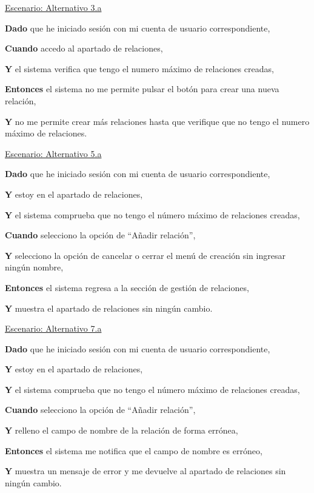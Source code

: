 \vspace{0.20cm}



\underline{Escenario: Alternativo 3.a}\par
\vspace{0.15cm}

\textbf{Dado} que he iniciado sesión con mi cuenta de usuario correspondiente,\par
\textbf{Cuando} accedo al apartado de relaciones,\par
\textbf{Y} el sistema verifica que tengo el numero máximo de relaciones creadas,\par
\textbf{Entonces} el sistema no me permite pulsar el botón para crear una nueva relación,\par
\textbf{Y} no me permite crear más relaciones hasta que verifique que no tengo el numero máximo de relaciones.\par
\vspace{0.20cm}

\underline{Escenario: Alternativo 5.a}\par
\vspace{0.15cm}

\textbf{Dado} que he iniciado sesión con mi cuenta de usuario correspondiente,\par
\textbf{Y} estoy en el apartado de relaciones,\par
\textbf{Y} el sistema comprueba que no tengo el número máximo de relaciones creadas,\par
\textbf{Cuando} selecciono la opción de \enquote{Añadir relación},\par
\textbf{Y} selecciono la opción de cancelar o cerrar el menú de creación sin ingresar ningún nombre,\par
\textbf{Entonces} el sistema regresa a la sección de gestión de relaciones,\par
\textbf{Y} muestra el apartado de relaciones sin ningún cambio.\par

\vspace{0.20cm}

\underline{Escenario: Alternativo 7.a}\par
\vspace{0.15cm}

\textbf{Dado} que he iniciado sesión con mi cuenta de usuario correspondiente,\par
\textbf{Y} estoy en el apartado de relaciones,\par
\textbf{Y} el sistema comprueba que no tengo el número máximo de relaciones creadas,\par
\textbf{Cuando} selecciono la opción de \enquote{Añadir relación},\par
\textbf{Y} relleno el campo de nombre de la relación de forma errónea,\par
\textbf{Entonces} el sistema me notifica que el campo de nombre es erróneo,\par
\textbf{Y} muestra un mensaje de error y me devuelve al apartado de relaciones sin ningún cambio.\par


